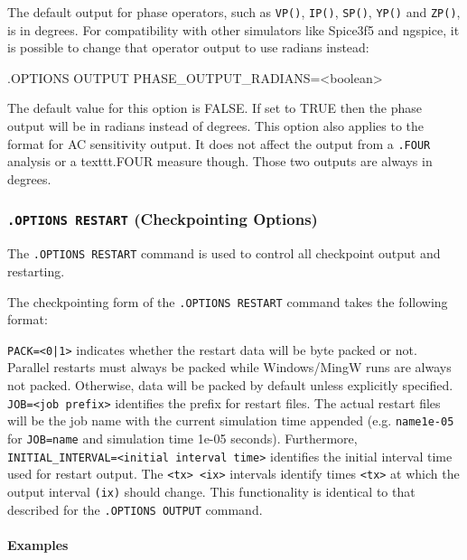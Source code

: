 The default \Xyce{} output for phase operators, such as \texttt{VP()}, \texttt{IP()},
\texttt{SP()}, \texttt{YP()} and \texttt{ZP()}, is in degrees.  For compatibility with
other simulators like Spice3f5 and ngspice, it is possible to change that operator
output to use radians instead:
\begin{vquote}
.OPTIONS OUTPUT PHASE\_OUTPUT\_RADIANS=<boolean>
\end{vquote}
The default value for this option is FALSE.  If set to TRUE then the phase output
will be in radians instead of degrees.  This option also applies to the format
for AC sensitivity output.  It does not affect the output from a \texttt{.FOUR}
analysis or a texttt{.FOUR} measure though.  Those two outputs are always in degrees.

\subsubsection{\texttt{.OPTIONS RESTART} (Checkpointing Options)}

The   \verb+.OPTIONS RESTART+ command is
used to control all  checkpoint output and restarting.

The checkpointing form of the \texttt{.OPTIONS RESTART} command takes the following format:

\texttt{PACK=<0|1>} indicates whether the restart data will be byte packed
or not.  Parallel restarts must always be packed while Windows/MingW
runs are always not packed.  Otherwise, data will be packed by default unless
explicitly specified.
\texttt{JOB=<job prefix>} identifies the prefix for restart files.  The
actual restart files will be the job name with the current simulation time
appended (e.g. \texttt{name1e-05} for \texttt{JOB=name} and simulation time
1e-05 seconds).  Furthermore, \texttt{INITIAL\_INTERVAL=<initial interval
  time>} identifies the initial interval time used for restart output.  The
\texttt{<tx> <ix>} intervals identify times \texttt{<tx>} at which the output
interval \texttt{(ix)} should change.  This functionality is identical to
that described for the \texttt{.OPTIONS OUTPUT} command.

\paragraph{Examples}

